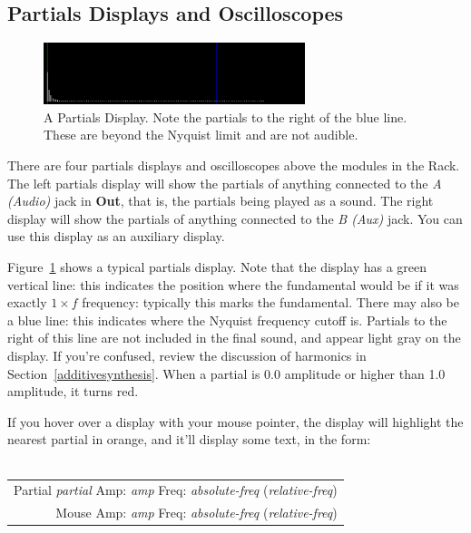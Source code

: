 \documentclass{article}
\begin{document}
\enlargethispage{1em}

\subsection{Partials Displays and Oscilloscopes}

\begin{figure}
\vspace{-1em}
\includegraphics[width=3in]{display}
\caption{A Partials Display.  Note the partials to the right of the blue line.  These are beyond the Nyquist limit and are not audible.}
\label{display}
\end{figure}

There are four partials displays and oscilloscopes above the modules in the Rack.  The left partials display will show the partials of anything connected to the {\it A (Audio)} jack in {\bf Out}, that is, the partials being played as a sound.  The right display will show the partials of anything connected to the {\it B (Aux)} jack.  You can use this display as an auxiliary display.

Figure~\ref{display} shows a typical partials display.  Note that the display has a green vertical line: this indicates the position where the fundamental would be if it was exactly \(1\times f\) frequency: typically this marks the fundamental.  There may also be a blue line: this indicates where the Nyquist frequency cutoff is. Partials to the right of this line are not included in the final sound, and appear light gray on the display.  If you're confused, review the discussion of harmonics in Section~\ref{additivesynthesis}.  When a partial is 0.0 amplitude or higher than 1.0 amplitude, it turns red.

If you hover over a display with your mouse pointer, the display will highlight the nearest partial in orange, and it'll display some text, in the form:\\
\\
\begin{tabular}{@{\hspace{1in}}r}
Partial {\it partial}  Amp: {\it amp}  Freq: {\it absolute-freq} ({\it relative-freq})\\
Mouse  Amp: {\it amp}  Freq: {\it absolute-freq} ({\it relative-freq})\\
\end{tabular}\\
\end{document}
